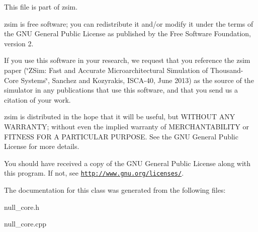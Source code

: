 This file is part of zsim.

zsim is free software; you can redistribute it and/or modify it under the terms of the G\-N\-U General Public License as published by the Free Software Foundation, version 2.

If you use this software in your research, we request that you reference the zsim paper (\char`\"{}\-Z\-Sim\-: Fast and Accurate Microarchitectural Simulation of
\-Thousand-\/\-Core Systems\char`\"{}, Sanchez and Kozyrakis, I\-S\-C\-A-\/40, June 2013) as the source of the simulator in any publications that use this software, and that you send us a citation of your work.

zsim is distributed in the hope that it will be useful, but W\-I\-T\-H\-O\-U\-T A\-N\-Y W\-A\-R\-R\-A\-N\-T\-Y; without even the implied warranty of M\-E\-R\-C\-H\-A\-N\-T\-A\-B\-I\-L\-I\-T\-Y or F\-I\-T\-N\-E\-S\-S F\-O\-R A P\-A\-R\-T\-I\-C\-U\-L\-A\-R P\-U\-R\-P\-O\-S\-E. See the G\-N\-U General Public License for more details.

You should have received a copy of the G\-N\-U General Public License along with this program. If not, see \href{http://www.gnu.org/licenses/}{\tt http\-://www.\-gnu.\-org/licenses/}. 

The documentation for this class was generated from the following files\-:\begin{DoxyCompactItemize}
\item 
null\-\_\-core.\-h\item 
null\-\_\-core.\-cpp\end{DoxyCompactItemize}
